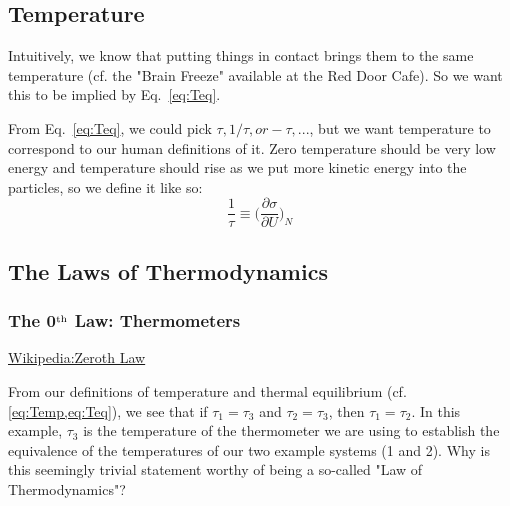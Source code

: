 \subsection{Temperature}
\label{s:Temperature}

Intuitively, we know that putting things in contact brings them to the same temperature
(cf. the "Brain Freeze" available at the Red Door Cafe). So we want this to be
implied by Eq.~\ref{eq:Teq}.

From Eq.~\ref{eq:Teq}, we could pick $\tau, 1/\tau, or -\tau,...$, but we want temperature
to correspond to our human definitions of it. Zero temperature should be very low energy
and temperature should rise as we put more kinetic energy into the particles, so we define
it like so:
\begin{equation}
\frac{1}{\tau} \equiv \bigg(\frac{\partial \sigma}{\partial U}\bigg)_{N}
\label{eq:Temp}
\end{equation}

\subsection{The Laws of Thermodynamics}

\subsubsection{The 0$^{\rm th}$ Law: Thermometers}
\href{http://en.wikipedia.org/wiki/Zeroth_law_of_thermodynamics}{Wikipedia:Zeroth Law}

From our definitions of temperature and thermal equilibrium 
(cf. \cref{eq:Temp,eq:Teq}), 
we see that if $\tau_1 = \tau_3$ and $\tau_2 = \tau_3$, then 
$\tau_1 = \tau_2$. 
In this example, $\tau_3$ is the temperature of the thermometer we are 
using to establish the equivalence of the temperatures of our two example 
systems (1 and 2). Why is this seemingly trivial statement worthy
of being a so-called "Law of Thermodynamics"? 



